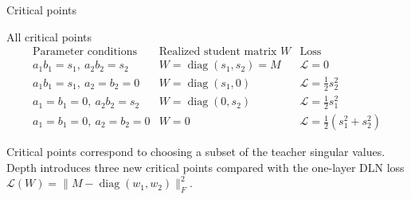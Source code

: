 \documentclass[aspectratio=169,11pt]{beamer}
\begin{document}
\begin{frame}{Critical points}

\begin{block}{All critical points}
\[
\begin{array}{c|c|c}
\text{Parameter conditions}
&
\text{Realized student matrix } W
&
\text{Loss}
\\
\hline
a_1b_1=s_1,\ a_2b_2=s_2
&
W=\operatorname{diag}(s_1,s_2)=M
&
\mathcal L=0
\\[0.4em]
a_1b_1=s_1,\ a_2=b_2=0
&
W=\operatorname{diag}(s_1,0)
&
\mathcal L=\frac12s_2^2
\\[0.4em]
a_1=b_1=0,\ a_2b_2=s_2
&
W=\operatorname{diag}(0,s_2)
&
\mathcal L=\frac12s_1^2
\\[0.4em]
a_1=b_1=0,\ a_2=b_2=0
&
W=0
&
\mathcal L=\frac12(s_1^2+s_2^2)
\end{array}
\]
\end{block}

\centering
\small
Critical points correspond to choosing a subset of the teacher singular values.
\\
Depth introduces three new critical points compared with the one-layer DLN loss $\mathcal{L}(W)=\lVert M - \operatorname{diag}(w_1,w_2)\rVert^2_F$.

\end{frame}
\end{document}
